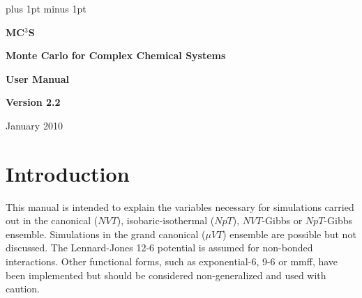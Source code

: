 \documentclass[12pt,letterpaper]{article}
\begin{document}
\parskip=6pt plus 1pt minus 1pt



\centerline{\bf \Huge MC$^3$S}

\vskip 24pt

\centerline{\bf \LARGE Monte Carlo for Complex Chemical Systems}

\vskip 24pt

\centerline{\bf \Large User Manual}

\vskip 24pt

\centerline{\bf \Large Version 2.2}

\vskip 36pt

\centerline{\large January 2010}

\eject

%
%
%
\section{Introduction}
\noindent This manual is intended to explain the variables necessary for
simulations carried out in the canonical ($NVT$), isobaric-isothermal
($NpT$), $NVT$-Gibbs or $NpT$-Gibbs ensemble.
Simulations in the grand canonical ($\mu VT$) ensemble are possible but not discussed.  
The Lennard-Jones 12-6 potential is assumed for non-bonded interactions.
Other functional forms, such as exponential-6, 9-6 or mmff, have been implemented
but should be considered non-generalized and used with caution.
\end{document}
